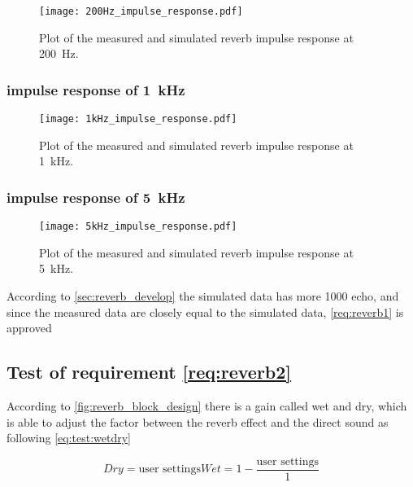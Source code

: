 \begin{figure}[htbp!]
    \centering
        \texttt{[image: 200Hz\_impulse\_response.pdf]}
        \caption{Plot of the measured and simulated \gls{reverb} impulse response at \SI{200}{\hertz}.}
        \label{fig:tests:reverb:200Hz}
  \end{figure}

  \newpage
\subsubsection*{impulse response of \SI{1}{\kilo\hertz}}

\begin{figure}[htbp!]
    \centering
        \texttt{[image: 1kHz\_impulse\_response.pdf]}
        \caption{Plot of the measured and simulated \gls{reverb} impulse response at \SI{1}{\kilo\hertz}.}
        \label{fig:tests:reverb:1kHz}
  \end{figure}
  
  
 \subsubsection*{impulse response of \SI{5}{\kilo\hertz}}

\begin{figure}[htbp!]
    \centering
        \texttt{[image: 5kHz\_impulse\_response.pdf]}
        \caption{Plot of the measured and simulated \gls{reverb} impulse response at \SI{5}{\kilo\hertz}.}
        \label{fig:tests:reverb:5kHz}
  \end{figure}
  
According to \autoref{sec:reverb_develop} the simulated data has more 1000 echo, and since the measured data are closely equal to the simulated data, \autoref{req:reverb1} is approved
  
  
\subsection{Test of requirement \autoref{req:reverb2}}
According to \autoref{fig:reverb_block_design} there is a gain called wet and dry, which is able to adjust the factor between the \gls{reverb} effect and the direct sound as following \autoref{eq:test:wetdry}

\begin{subequations}\label{eq:test:wetdry}
\begin{equation}
Dry = \text{user settings}
    \end{equation}
\begin{equation}
Wet = 1-\frac{\text{user settings}}{1} 
    \end{equation}
 \end{subequations}
    \startexplain
    \stopexplain


